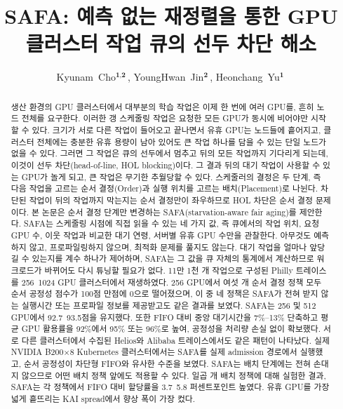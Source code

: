 \documentclass{ieeetj}
\def\authorrefmark#1{\ensuremath{^{\textbf{#1}}}}
\begin{document}


\title{SAFA: 예측 없는 재정렬을 통한 GPU 클러스터 작업 큐의 선두 차단 해소}

\author{Kyunam~Cho\authorrefmark{1,2}\,, YoungHwan~Jin\authorrefmark{2}\,, Heonchang~Yu\authorrefmark{1}\,}

\begin{abstract}
생산 환경의 GPU 클러스터에서 대부분의 학습 작업은 이제 한 번에 여러 GPU를, 흔히 노드 전체를 요구한다. 이러한 갱 스케줄링 작업은 요청한 모든 GPU가 동시에 비어야만 시작할 수 있다. 크기가 서로 다른 작업이 들어오고 끝나면서 유휴 GPU는 노드들에 흩어지고, 클러스터 전체에는 충분한 유휴 용량이 남아 있어도 큰 작업 하나를 담을 수 있는 단일 노드가 없을 수 있다. 그러면 그 작업은 큐의 선두에서 멈추고 뒤의 모든 작업까지 기다리게 되는데, 이것이 선두 차단(head-of-line, HOL blocking)이다. 그 결과 뒤의 대기 작업이 사용할 수 있는 GPU가 놀게 되고, 큰 작업은 무기한 추월당할 수 있다. 스케줄러의 결정은 두 단계, 즉 다음 작업을 고르는 순서 결정(Order)과 실행 위치를 고르는 배치(Placement)로 나뉜다. 차단된 작업이 뒤의 작업까지 막는지는 순서 결정만이 좌우하므로 HOL 차단은 순서 결정 문제이다. 본 논문은 순서 결정 단계만 변경하는 SAFA(starvation-aware fair aging)를 제안한다. SAFA는 스케줄링 시점에 직접 읽을 수 있는 네 가지 값, 즉 큐에서의 작업 위치, 요청 GPU 수, 이웃 작업과 비교한 대기 연령, 서버별 유휴 GPU 수만을 관찰한다. 아무것도 예측하지 않고, 프로파일링하지 않으며, 최적화 문제를 풀지도 않는다. 대기 작업을 얼마나 앞당길 수 있는지를 계수 하나가 제어하며, SAFA는 그 값을 큐 자체의 통계에서 계산하므로 워크로드가 바뀌어도 다시 튜닝할 필요가 없다. 11만 1천 개 작업으로 구성된 Philly 트레이스를 256~1024 GPU 클러스터에서 재생하였다. 256 GPU에서 여섯 개 순서 결정 정책 모두 순서 공정성 점수가 100점 만점에 0으로 떨어졌으며, 이 중 네 정책은 SAFA가 전혀 받지 않는 실행시간 또는 프로파일 정보를 제공받고도 같은 결과를 보였다. SAFA는 256 및 512 GPU에서 92.7~93.5점을 유지했다. 또한 FIFO 대비 중앙 대기시간을 7\%--13\% 단축하고 평균 GPU 활용률을 92\%에서 95\% 또는 96\%로 높여, 공정성을 처리량 손실 없이 확보했다. 서로 다른 클러스터에서 수집된 Helios와 Alibaba 트레이스에서도 같은 패턴이 나타났다. 실제 NVIDIA B200$\times$8 Kubernetes 클러스터에서는 SAFA를 실제 admission 경로에서 실행했고, 순서 공정성이 차단형 FIFO와 유사한 수준을 보였다. SAFA는 배치 단계에는 전혀 손대지 않으므로 어떤 배치 정책 앞에도 적용할 수 있다. 일곱 개 배치 정책에 대해 실험한 결과, SAFA는 각 정책에서 FIFO 대비 할당률을 3.7~5.8 퍼센트포인트 높였다. 유휴 GPU를 가장 넓게 흩뜨리는 KAI spread에서 향상 폭이 가장 컸다.
\end{abstract}
\end{document}
